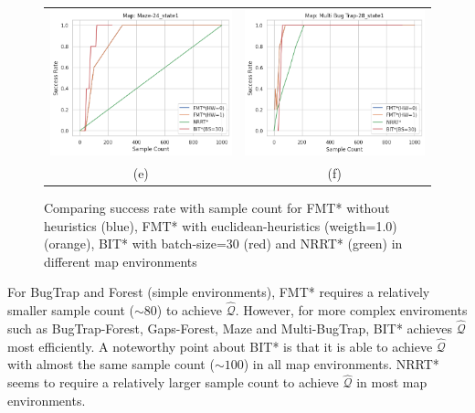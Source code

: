 \documentclass{article}
\begin{document}
\begin{figure}[H]
{\begin{tabular}{cc}
			\includegraphics[scale=0.45]{srVsc_Maze-24_state1.png} & \includegraphics[scale=0.45]{srVsc_Multi Bug Trap-28_state1.png}  \\
			(e) & (f)  \\[6pt]
		\end{tabular}
	}
	\caption{Comparing success rate with sample count for FMT* without heuristics (blue), FMT* with euclidean-heuristics (weigth=1.0) (orange), BIT* with batch-size=30 (red) and NRRT* (green) in different map environments}
\end{figure}

For BugTrap and Forest (simple environments), FMT* requires a relatively smaller sample count ($\sim 80$) to achieve $\hat{\mathcal{Q}}$. However, for more complex enviroments such as BugTrap-Forest, Gaps-Forest, Maze and Multi-BugTrap, BIT* achieves $\hat{\mathcal{Q}}$ most efficiently. A noteworthy point about BIT* is that it is able to achieve $\hat{\mathcal{Q}}$ with almost the same sample count ($\sim 100$) in all map environments. NRRT* seems to require a relatively larger sample count to achieve $\hat{\mathcal{Q}}$ in most map environments.
\end{document}
